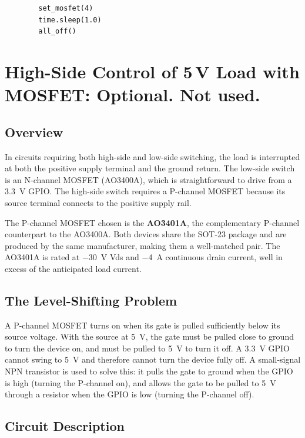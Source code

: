\documentclass[12pt,letterpaper]{article}
\begin{document}
	\begin{verbatim}
		set_mosfet(4)
		time.sleep(1.0)
		all_off()
	\end{verbatim}
	
	
	\section{High-Side Control of 5\,V Load with MOSFET: Optional. Not used.}
	
	\subsection{Overview}
	
	In circuits requiring both high-side and low-side switching, the load is interrupted at
	both the positive supply terminal and the ground return. The low-side switch is an
	N-channel MOSFET (AO3400A), which is straightforward to drive from a \SI{3.3}{\volt}
	GPIO. The high-side switch requires a P-channel MOSFET because its source terminal
	connects to the positive supply rail.
	
	The P-channel MOSFET chosen is the \textbf{AO3401A}, the complementary P-channel
	counterpart to the AO3400A. Both devices share the SOT-23 package and are produced
	by the same manufacturer, making them a well-matched pair. The AO3401A is rated at
	\SI{-30}{\volt} Vds and \SI{-4}{\ampere} continuous drain current, well in excess of
	the anticipated load current.
	
	\subsection{The Level-Shifting Problem}
	
	A P-channel MOSFET turns on when its gate is pulled sufficiently below its source
	voltage. With the source at \SI{+5}{\volt}, the gate must be pulled close to ground
	to turn the device on, and must be pulled to \SI{+5}{\volt} to turn it off. A
	\SI{3.3}{\volt} GPIO cannot swing to \SI{+5}{\volt} and therefore cannot turn the
	device fully off. A small-signal NPN transistor is used to solve this: it pulls the
	gate to ground when the GPIO is high (turning the P-channel on), and allows the gate
	to be pulled to \SI{+5}{\volt} through a resistor when the GPIO is low (turning the
	P-channel off).
	
	\subsection{Circuit Description}
	
\end{document}
